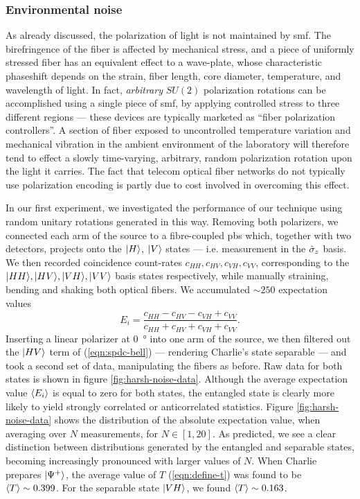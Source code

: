\subsubsection{Environmental noise} 
As already discussed, the polarization of light is not maintained by \acrshort{smf}. The birefringence of the fiber is affected by mechanical stress, and a piece of uniformly stressed fiber has an equivalent effect to a wave-plate, whose characteristic phaseshift depends on the strain, fiber length, core diameter, temperature, and wavelength of light. In fact, \emph{arbitrary} $SU(2)$ polarization rotations can be accomplished using a single piece of \acrshort{smf}, by applying controlled stress to three different regions --- these devices are typically marketed as ``fiber polarization controllers''. A section of fiber exposed to uncontrolled temperature variation and mechanical vibration in the ambient environment of the laboratory will therefore tend to effect a slowly time-varying, arbitrary, random polarization rotation upon the light it carries. The fact that telecom optical fiber networks do not typically use polarization encoding is partly due to cost involved in overcoming this effect.

In our first experiment, we investigated the performance of our technique using random unitary rotations generated in this way. Removing both polarizers, we connected each arm of the source to a fibre-coupled \gls{pbs} which, together with two detectors, projects onto the $\mbox{$ | H \rangle $}$, $\mbox{$ | V \rangle $}$ states --- i.e. measurement in the $\hat{\sigma}_z$ basis. We then recorded coincidence count-rates $c_{HH}, c_{HV}, c_{VH}, c_{VV}$, corresponding to the $\mbox{$ | HH \rangle $}, \mbox{$ | HV \rangle $}, \mbox{$ | VH \rangle $}, \mbox{$ | VV \rangle $}$ basis states respectively, while manually straining, bending and shaking both optical fibers. We accumulated $\sim 250$ expectation values
\begin{equation}
    E_i = \frac{c_{HH} - c_{HV} - c_{VH} + c_{VV}}{c_{HH} + c_{HV} + c_{VH} + c_{VV}}.
\end{equation}
Inserting a linear polarizer at \SI{0}{\degree} into one arm of the source, we then filtered out the $\mbox{$ | HV \rangle $}$ term of (\ref{eqn:spdc-bell}) --- rendering Charlie's state separable --- and took a second set of data, manipulating the fibers as before. Raw data for both states is shown in figure \ref{fig:harsh-noise-data}. Although the average expectation value $\langle E_i \rangle$ is equal to zero for both states, the entangled state is clearly more likely to yield strongly correlated or anticorrelated statistics. Figure \ref{fig:harsh-noise-data} shows the distribution of the absolute expectation value, when averaging over $N$ measurements, for $N \in \left[ 1, 20 \right]$. As predicted, we see a clear distinction between distributions generated by the entangled and separable states, becoming increasingly pronounced with larger values of $N$. When Charlie prepares $\mbox{$ | \Psi^+ \rangle $}$, the average value of $T$ (\ref{eqn:define-t}) was found to be $\langle T \rangle\sim 0.399$. For the separable state $\mbox{$ | VH \rangle $}$, we found $\langle T \rangle\sim0.163$. 

